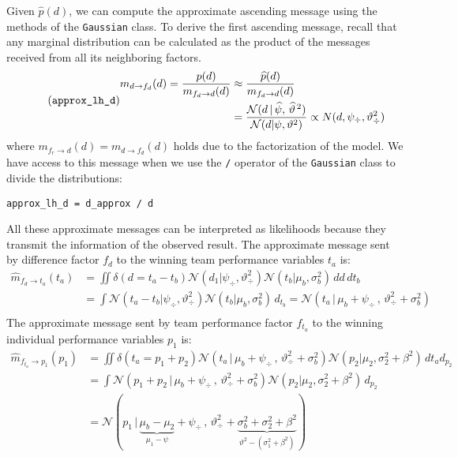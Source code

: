 \documentclass[article]{jss}
\newcommand{\N}{\mathcal{N}}
\begin{document}
Given $\widehat{p}(d)$, we can compute the approximate ascending message using the methods of the \texttt{Gaussian} class. 
To derive the first ascending message, recall that any marginal distribution can be calculated as the product of the messages received from all its neighboring factors. 
%
\begin{equation}\label{eq:m^_d_fd} \tag{\texttt{approx\_lh\_d}}
\begin{split}
 m_{d \rightarrow f_{d}}(d)   = \frac{p(d)}{m_{f_{d} \rightarrow d}(d)} 
 & \approx \frac{\widehat{p}(d)}{m_{f_{d} \rightarrow d}(d)}  \\
& = \frac{\N(d \,  | \,\widehat{\psi} , \, \widehat{\vartheta}^{\,2} )}{\N(d | \psi, \vartheta^2)} 
\propto N(d,\psi_{\div},\vartheta_{\div}^2 )
\end{split}
\end{equation}
where $m_{f_r \rightarrow d}(d) = m_{d \rightarrow f_{d}}(d)$ holds due to the factorization of the model. 
We have access to this message when we use the \texttt{/} operator of the \texttt{Gaussian} class to divide the distributions:
%
\begin{lstlisting}[captionpos=b,backgroundcolor=\color{all},label=lst:d_div, caption={Computing the first approximate message.},belowskip=0cm]
approx_lh_d = d_approx / d
\end{lstlisting}
All these approximate messages can be interpreted as likelihoods because they transmit the information of the observed result. 
The approximate message sent by difference factor $f_d$ to the winning team performance variables $t_a$ is:
\begin{equation}%
\begin{split}
\widehat{m}_{f_{d} \rightarrow t_a}(t_a) & =  \iint \delta(d = t_a - t_b) \N(d_1 | \psi_{\div}, \vartheta_{\div}^2) \N(t_b | \mu_b , \sigma_b^2 )  \, d{d} \,dt_b \\
& = \int  \N( t_a-t_b | \psi_{\div}, \vartheta_{\div}^2) \N(t_b | \mu_b , \sigma_b^2 )  \,  d_{t_b} = \N(t_a \, | \, \mu_b + \psi_{\div} \, , \, \vartheta_{\div}^2 + \sigma_b^2) \\
\end{split}
\end{equation}
%
The approximate message sent by team performance factor $f_{t_a}$ to the winning individual performance variables $p_1$ is:%
%
\begin{equation}%
\begin{split}
\widehat{m}_{f_{t_a} \rightarrow p_1}(p_1) &= \iint \delta(t_a = p_1 + p_2) \N(t_a \, | \, \mu_b + \psi_{\div} \, , \, \vartheta_{\div}^2 + \sigma_b^2) \N(p_2 | \mu_2 , \sigma_2^2 + \beta^2)  \, d{t_a} d_{p_2} \\
& = \int \N(p_1 + p_2 \, | \, \mu_b + \psi_{\div} \, , \, \vartheta_{\div}^2 + \sigma_b^2) \N(p_2 | \mu_2 , \sigma_2^2+ \beta^2 )   \, d_{p_2} \\
& = \N( p_1 \,|\,  \underbrace{\mu_b - \mu_2}_{\mu_1-\psi} + \psi_{\div}  \,,\,\vartheta_{\div}^2 + \underbrace{\sigma_b^2 + \sigma_2^2 + \beta^2}_{\vartheta^2 - (\sigma_1^2 + \beta^2)})  \\
\end{split}
\end{equation}
\end{document}
